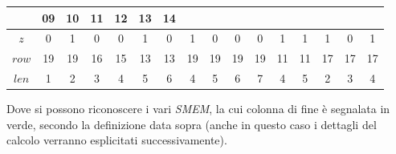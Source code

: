 \begin{esempio}
\begin{table}[H]
\begin{tabular}{c|ccccccccccccccc}
      &  {\color{nordgreen}09} & 10 &  {\color{nordgreen}11} & 12 & 13
      &  {\color{nordgreen}14} \\
      \hline
      \hline
      $z$ & 0 & 1 & 0 & 0 & 1 &  {\color{nordgreen}0} & 1 & 0 & 0
      &  {\color{nordgreen}0} & 1 &  {\color{nordgreen}1} & 1 & 0
      &  {\color{nordgreen}1} \\
      \hline
      $row$ & 19 & 19 & 16 & 15 & 13 &  {\color{nordgreen}13} & 19 & 19 & 19
      &  {\color{nordgreen}19} & 11 &  {\color{nordgreen}11} & 17 & 17
      &  {\color{nordgreen}17} \\
      $len$ & 1 & 2 & 3 & 4 & 5 & {\color{nordgreen}6} & 4 & 5 & 6
      & {\color{nordgreen}7} & 4 & {\color{nordgreen}5} & 2 & 3
      & {\color{nordgreen}4}\\
    \end{tabular}
  \end{table}
  Dove si possono riconoscere i vari \textit{SMEM}, la cui colonna di fine è
  segnalata in verde, secondo la definizione data
  sopra (anche in questo caso i dettagli del calcolo
  verranno esplicitati successivamente). 
\end{esempio}

